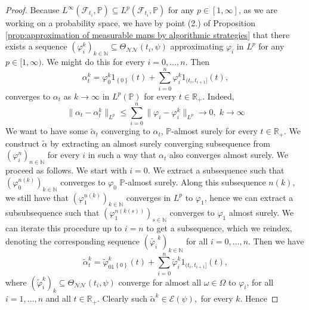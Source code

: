 \documentclass[11pt,a4paper,twoside,openany]{report}
\numberwithin{equation}{section}
\theoremstyle{plain} %
\theoremstyle{definition} %
\theoremstyle{remark} %
\begin{document}
\begin{proof}
     Because \(L^{\infty}(\mathcal{F}_{t_i},\mathbb{P})\subseteq L^p(\mathcal{F}_{t_i},\mathbb{P})\) for any \(p\in[1,\infty]\), as we are working on a probability space, we have by point (2.)  of Proposition \ref{prop:approximation of measurable maps by algorithmic strategies} that there exists a sequence \((\varphi_i^k)_{k\in\mathbb{N}}\subseteq\Theta_{\mathcal{NN}}(t_i,\psi)\) approximating \(\varphi_i\) in \(L^p\) for any \(p\in[1,\infty)\). 
    We might do this for every \(i=0,\dots, n\). Then 
    \begin{equation*}
        \alpha_t^k=\varphi_0^k1_{\left\{ 0\right\}}(t)+\sum_{i=0}^n \varphi_i^k1_{(t_i,t_{i+1}]}(t),
    \end{equation*}
    converges to \(\alpha_t\) as \(k\to\infty\) in \(L^p(\mathbb{P})\) for every \(t\in\mathbb{R}_+\). Indeed, 
    \begin{equation*}
        \lVert \alpha_t-\alpha_t^k\rVert_{L^p}\leq\sum_{i=0}^n\lVert\varphi_i-\varphi_i^k\rVert_{L^p}\to0,\;k\to\infty
    \end{equation*}
    We want to have some \(\widetilde{\alpha}_t\) converging to \(\alpha_t\), \(\mathbb{P}\)-almost surely for every \(t\in\mathbb{R}_+\). We construct \(\widetilde{\alpha}\) by extracting an almost surely converging subsequence from \((\varphi_i^n)_{n\in\mathbb{N}}\) for every \(i\) in such a way that \(\alpha_t\) also converges almost surely. We proceed as follows.
    We start with \(i=0\). We extract a subsequence such that \((\varphi_0^{n(k)})_{k\in\mathbb{N}}\) converges to \(\varphi_0\) \(\mathbb{P}\)-almost surely. Along this subsequence \(n(k)\), we still have that \((\varphi_{1}^{n(k)})_{k\in\mathbb{N}}\) converges in \(L^p\) to \(\varphi_1\), hence we can extract a subsubsequence such that \((\varphi_{1}^{n(k(s))})_{s\in\mathbb{N}}\) converges to \(\varphi_1\) almost surely. We can iterate this procedure up to \(i=n\) to get a subsequence, which we reindex, denoting the corresponding sequence \((\widetilde{\varphi_i}^k)_{k\in\mathbb{N}}\) for all \(i=0,\dots,n\). Then we have 
   \begin{equation*}
        \widetilde{\alpha}_t^{k} = \widetilde{\varphi}^{k}_01_{\left\{ 0\right\}}(t)+\sum_{i=0}^n \widetilde{\varphi}_i^{k}1_{(t_i,t_{i+1}]}(t),
    \end{equation*}
    where \((\widetilde{\varphi}_i^{k})_{k}\subseteq\Theta_{\mathcal{NN}}(t_i,\psi)\) converge for almost all \(\omega\in\Omega\) to \(\varphi_i\), for all \(i=1,\dots,n\) and all \(t\in\mathbb{R}_+\). Clearly such \(\widetilde{\alpha}^{k}\in\mathcal{E}(\psi),\) for every \(k\). Hence

\end{proof}
\end{document}
